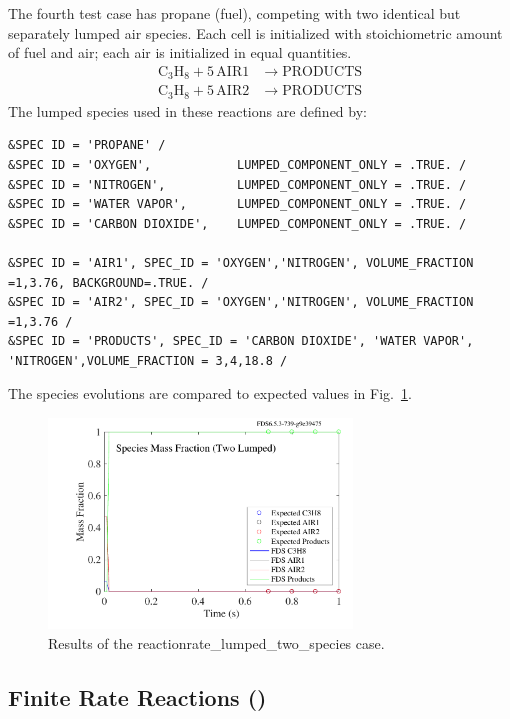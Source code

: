 \documentclass[11pt]{book}
\begin{document}
The fourth test case has propane (fuel), competing with two identical but separately lumped air species. Each cell is initialized with stoichiometric amount of fuel and air; each air is initialized in equal quantities.
\begin{align}\label{eq:lumped_2_air}
\mathrm{C_3H_8 + 5 \, AIR1} &\rightarrow  \mathrm{PRODUCTS} \\
\nonumber \mathrm{C_3H_8 + 5 \, AIR2} &\rightarrow \mathrm{PRODUCTS}
\end{align}
The lumped species used in these reactions are defined by:
\begin{lstlisting}
&SPEC ID = 'PROPANE' /
&SPEC ID = 'OXYGEN',            LUMPED_COMPONENT_ONLY = .TRUE. /
&SPEC ID = 'NITROGEN',          LUMPED_COMPONENT_ONLY = .TRUE. /
&SPEC ID = 'WATER VAPOR',       LUMPED_COMPONENT_ONLY = .TRUE. /
&SPEC ID = 'CARBON DIOXIDE',    LUMPED_COMPONENT_ONLY = .TRUE. /

&SPEC ID = 'AIR1', SPEC_ID = 'OXYGEN','NITROGEN', VOLUME_FRACTION =1,3.76, BACKGROUND=.TRUE. /
&SPEC ID = 'AIR2', SPEC_ID = 'OXYGEN','NITROGEN', VOLUME_FRACTION =1,3.76 /
&SPEC ID = 'PRODUCTS', SPEC_ID = 'CARBON DIOXIDE', 'WATER VAPOR', 'NITROGEN',VOLUME_FRACTION = 3,4,18.8 /
\end{lstlisting}
The species evolutions are compared to expected values in Fig.~\ref{fig:reactionrate_lumped_two_air}.
\begin{figure}[!ht]
\centering
\includegraphics[height=2.2in]{SCRIPT_FIGURES/reactionrate_lumped_two_air}
\caption[Results of the {\ct reactionrate\_lumped\_two\_species} case]{Results of the {\ct reactionrate\_lumped\_two\_species} case.}
\label{fig:reactionrate_lumped_two_air}
\end{figure}

\clearpage

\subsection{Finite Rate Reactions (\texorpdfstring{}{reactionrate\_arrhenius})}
\label{finite_rate_reactions}
\label{reactionrate_arrhenius_equilibrium}
\label{reactionrate_arrhenius_0order_1step}
\label{reactionrate_arrhenius_2order_1step}
\label{reactionrate_arrhenius_1p75order_2step}
\label{reactionrate_arrhenius_1p75order_2stepr}
\end{document}

